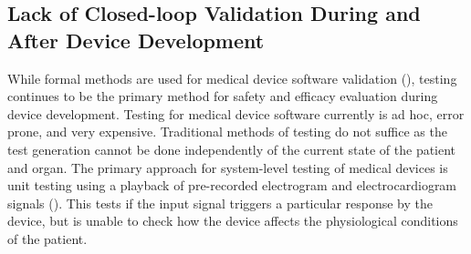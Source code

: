 \subsection{Lack of Closed-loop Validation During and After Device Development}
While formal methods are used for medical device software validation (\cite{challenge, challenge2, challenge3}), testing continues to be the primary method for safety and efficacy evaluation during device development.
Testing for medical device software currently is ad hoc, error prone, and very expensive. 
Traditional methods of testing do not suffice as the test generation cannot be done independently of the current state of the patient and organ. 
The primary approach for system-level testing of medical devices is unit testing using a playback of pre-recorded electrogram and electrocardiogram signals (\cite{testing_imd, Vip}). 
This tests if the input signal triggers a particular response by the device, but is unable to check how the device affects the physiological conditions of the patient.

